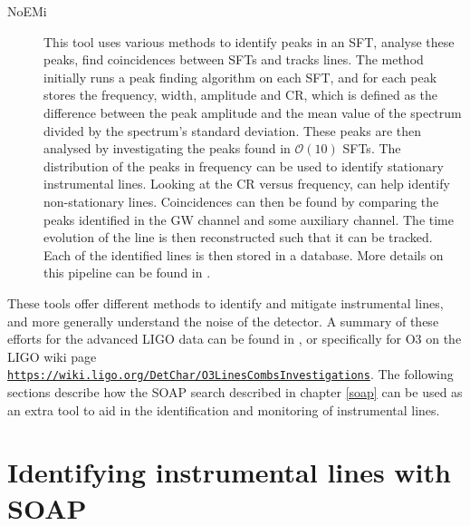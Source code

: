 \begin{description}
	
	\item[\Gls{NoEMi}] This tool uses various methods to identify peaks in an \gls{SFT}, analyse these peaks, find coincidences between \glspl{SFT} and tracks lines. 
	The method initially runs a peak finding algorithm on each \gls{SFT}, and for each peak stores the frequency, width, amplitude and \gls{CR}, which is defined as the difference between the peak amplitude and the mean value of the spectrum divided by the spectrum's standard deviation.
	These peaks are then analysed by investigating the peaks found in $\mathcal{O}(10)$ \glspl{SFT}. 
	The distribution of the peaks in frequency can be used to identify stationary instrumental lines. 
	Looking at the \gls{CR} versus frequency, can help identify non-stationary lines.
	Coincidences can then be found by comparing the peaks identified in the \gls{GW} channel and some auxiliary channel. 
	The time evolution of the line is then reconstructed such that it can be tracked.
	Each of the identified lines is then stored in a database.
	More details on this pipeline can be found in \citep{accadia2012NoEMiNoise}.

	
\end{description}


These tools offer different methods to identify and mitigate instrumental lines, and more generally understand the noise of the detector. A summary of these efforts for
the advanced \gls{LIGO} data can be found in
\citep{covas2018IdentificationMitigation}, or specifically for O3 on the \gls{LIGO} wiki page {\tt
\url{https://wiki.ligo.org/DetChar/O3LinesCombsInvestigations}}. The following
sections describe how the SOAP search described in chapter \ref{soap} can be used
as an extra tool to aid in the identification and monitoring of instrumental
lines.


\section{\label{detchar:soap}Identifying instrumental lines with SOAP}

